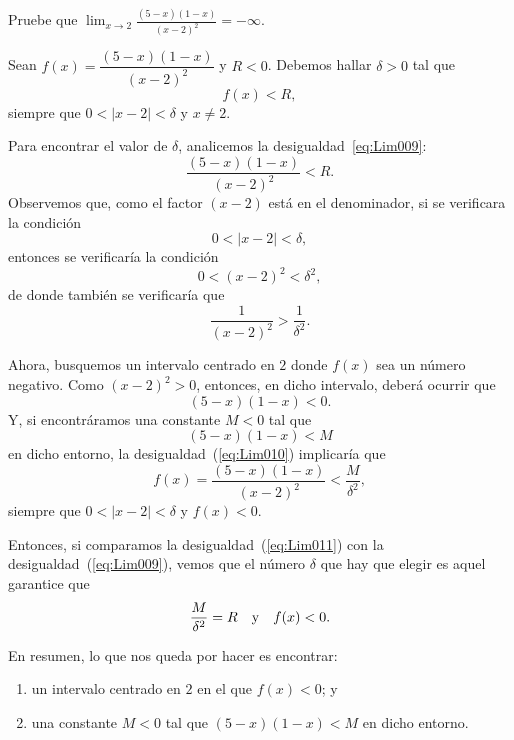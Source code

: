 \begin{exemplo}[Solución]{%
Pruebe que $\displaystyle \lim_{x\to 2}\frac{(5-x)(1 - x)}{(x-2)^2}=-\infty$.}%
\def\f(x){\dfrac{(5-x)(1 - x)}{(x-2)^2}}

Sean $f(x)=\dfrac{(5-x)(1 - x)}{(x-2)^2}$ y $R<0$. Debemos hallar $\delta>0$ tal que
\begin{equation}
\label{eq:Lim009}
	f(x)<R,
\end{equation}
siempre que $0<|x-2|<\delta$ y $x\neq 2$.

Para encontrar el valor de $\delta$, analicemos la desigualdad~\ref{eq:Lim009}:
\[
\f(x) < R.
\]
Observemos que, como el factor $(x - 2)$ está en el denominador, si se verificara la condición
\[
0 < |x - 2| < \delta,
\]
entonces se verificaría la condición
\[
0 < (x - 2)^2 < \delta^2,
\]
de donde también se verificaría que
\begin{equation}
\label{eq:Lim010}
\frac{1}{(x - 2)^2} > \frac{1}{\delta^2}.
\end{equation}

Ahora, busquemos un intervalo centrado en $2$ donde $f(x)$ sea un número negativo. Como $(x - 2)^2
> 0$, entonces, en dicho intervalo, deberá ocurrir que
\[
(5 - x)(1 - x) < 0.
\]
Y, si encontráramos una constante $M < 0$ tal que
\[
(5 - x)(1 - x) < M
\]
en dicho entorno, la desigualdad~(\ref{eq:Lim010}) implicaría que
\begin{equation}
\label{eq:Lim011}
f(x) = \f(x) < \frac{M}{\delta^2},
\end{equation}
siempre que $0 < |x - 2| < \delta$ y $f(x) < 0$.

Entonces, si comparamos la desigualdad~(\ref{eq:Lim011}) con la desigualdad~(\ref{eq:Lim009}),
vemos que el número $\delta$ que hay que elegir es aquel garantice que
\[
\frac{M}{\delta^2} = R \quad\text{y}\quad f(x) < 0.
\]

En resumen, lo que nos queda por hacer es encontrar:
\begin{enumerate}
\item un intervalo centrado en $2$ en el que $f(x) < 0$; y
\item una constante $M < 0$ tal que $(5 - x)(1 - x) < M$ en dicho entorno.
\end{enumerate}


\end{exemplo}
